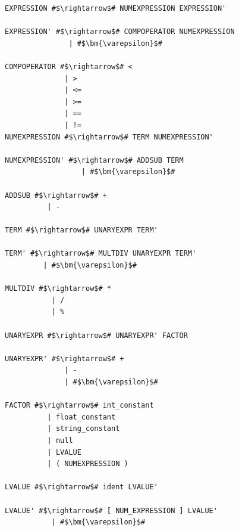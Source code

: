 \documentclass[
	12pt,				%
	openright,			%
	twoside,			%
	a4paper,			%
	english,			%
	french,				%
	spanish,			%
	brazil				%
	]{abntex2}
\begin{document}
\begin{lstlisting}[escapechar=\#]
EXPRESSION #$\rightarrow$# NUMEXPRESSION EXPRESSION' 

EXPRESSION' #$\rightarrow$# COMPOPERATOR NUMEXPRESSION 
               | #$\bm{\varepsilon}$# 

COMPOPERATOR #$\rightarrow$# < 
              | > 
              | <= 
              | >= 
              | == 
              | !=  
NUMEXPRESSION #$\rightarrow$# TERM NUMEXPRESSION' 

NUMEXPRESSION' #$\rightarrow$# ADDSUB TERM 
                  | #$\bm{\varepsilon}$# 

ADDSUB #$\rightarrow$# + 
          | - 

TERM #$\rightarrow$# UNARYEXPR TERM' 

TERM' #$\rightarrow$# MULTDIV UNARYEXPR TERM' 
         | #$\bm{\varepsilon}$# 

MULTDIV #$\rightarrow$# * 
           | / 
           | % 

UNARYEXPR #$\rightarrow$# UNARYEXPR' FACTOR 

UNARYEXPR' #$\rightarrow$# + 
              | - 
              | #$\bm{\varepsilon}$# 

FACTOR #$\rightarrow$# int_constant 
          | float_constant 
          | string_constant 
          | null 
          | LVALUE 
          | ( NUMEXPRESSION ) 

LVALUE #$\rightarrow$# ident LVALUE' 

LVALUE' #$\rightarrow$# [ NUM_EXPRESSION ] LVALUE' 
           | #$\bm{\varepsilon}$# 
\end{lstlisting}
\end{document}
